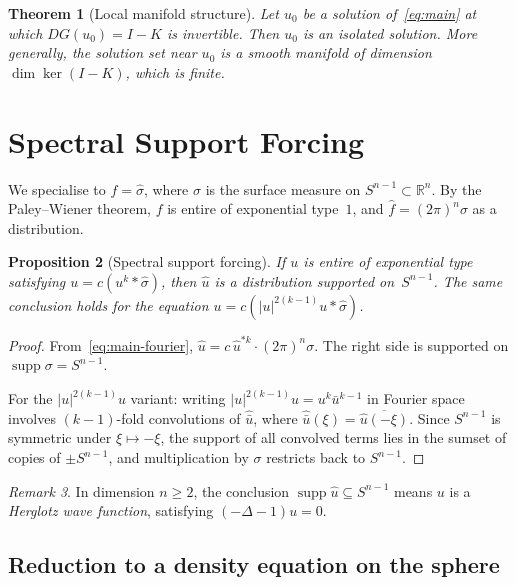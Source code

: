 \documentclass[12pt]{article}
\newtheorem{theorem}{Theorem}[section]
\newtheorem{proposition}[theorem]{Proposition}
\theoremstyle{definition}
\theoremstyle{remark}
\newtheorem{remark}[theorem]{Remark}
\DeclareMathOperator{\supp}{supp}
\newcommand{\R}{\mathbb{R}}
\newcommand{\wh}{\widehat}
\begin{document}
\begin{theorem}[Local manifold structure]
  \label{thm:local-mfd}
  Let $u_0$ be a solution of~\eqref{eq:main} at which $DG(u_0)=I-K$ is
  invertible.  Then $u_0$ is an isolated solution.  More generally, the
  solution set near $u_0$ is a smooth manifold of dimension
  $\dim\ker(I-K)$, which is finite.
\end{theorem}

\section{Spectral Support Forcing}
\label{sec:spectral-forcing}

We specialise to $f=\wh\sigma$, where $\sigma$ is the surface measure on
$S^{n-1}\subset\R^n$.  By the Paley--Wiener theorem, $f$ is entire of
exponential type~$1$, and $\wh f=(2\pi)^n\sigma$ as a distribution.

\begin{proposition}[Spectral support forcing]
  \label{prop:support-forcing}
  If $u$ is entire of exponential type satisfying $u=c(u^k\ast\wh\sigma)$,
  then $\wh u$ is a distribution supported on~$S^{n-1}$.
  The same conclusion holds for the equation $u=c(|u|^{2(k-1)}u\ast\wh\sigma)$.
\end{proposition}

\begin{proof}
  From~\eqref{eq:main-fourier}, $\wh u=c\,\wh u^{\ast k}\cdot(2\pi)^n\sigma$.
  The right side is supported on $\supp\sigma=S^{n-1}$.

  For the $|u|^{2(k-1)}u$ variant: writing $|u|^{2(k-1)}u=u^k\bar u^{k-1}$
  in Fourier space involves $(k-1)$-fold convolutions of $\wh{\bar u}$, where
  $\wh{\bar u}(\xi)=\overline{\wh u(-\xi)}$.  Since $S^{n-1}$ is symmetric
  under $\xi\mapsto-\xi$, the support of all convolved terms lies in the
  sumset of copies of $\pm S^{n-1}$, and multiplication by $\sigma$ restricts
  back to $S^{n-1}$.
\end{proof}

\begin{remark}
  In dimension $n\geq 2$, the conclusion $\supp\wh u\subseteq S^{n-1}$ means
  $u$ is a \emph{Herglotz wave function}, satisfying $(-\Delta-1)u=0$.
\end{remark}

\subsection{Reduction to a density equation on the sphere}
\end{document}
